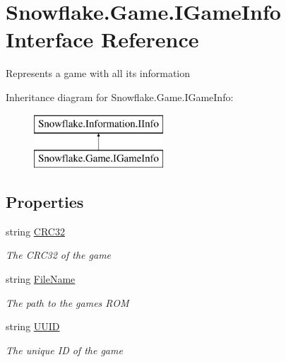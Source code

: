 \hypertarget{interface_snowflake_1_1_game_1_1_i_game_info}{}\section{Snowflake.\+Game.\+I\+Game\+Info Interface Reference}
\label{interface_snowflake_1_1_game_1_1_i_game_info}


Represents a game with all it\textquotesingle{}s information  


Inheritance diagram for Snowflake.\+Game.\+I\+Game\+Info\+:\begin{figure}[H]
\begin{center}
\leavevmode
\includegraphics[height=2.000000cm]{interface_snowflake_1_1_game_1_1_i_game_info}
\end{center}
\end{figure}
\subsection*{Properties}
\begin{DoxyCompactItemize}
\item 
string \hyperlink{interface_snowflake_1_1_game_1_1_i_game_info_a9a22682d66d9686ff4d64e83eb961624}{C\+R\+C32}
\begin{DoxyCompactList}\small\item\em The C\+R\+C32 of the game \end{DoxyCompactList}\item 
string \hyperlink{interface_snowflake_1_1_game_1_1_i_game_info_a9d47fb0690eb47f4bdf2e0e60afc4555}{File\+Name}
\begin{DoxyCompactList}\small\item\em The path to the game\textquotesingle{}s R\+O\+M \end{DoxyCompactList}\item 
string \hyperlink{interface_snowflake_1_1_game_1_1_i_game_info_ad1ce0e9aece31e7b1f38f867177e7bee}{U\+U\+I\+D}
\begin{DoxyCompactList}\small\item\em The unique I\+D of the game \end{DoxyCompactList}\end{DoxyCompactItemize}


